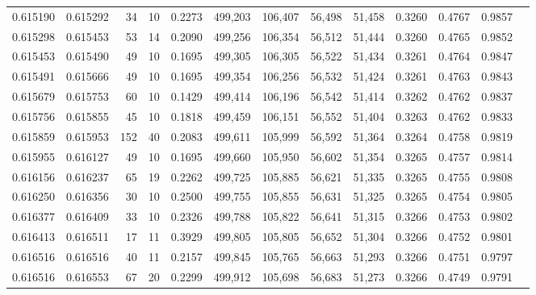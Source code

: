 \begin{tabular}{rrrrrrrrrrrrr}
0.615190 & 0.615292 &    34 &  10 &                                     0.2273 & 499,203 & 106,407 &  56,498 &  51,458 & 0.3260 & 0.4767 & 0.9857 \\
0.615298 & 0.615453 &    53 &  14 &                                     0.2090 & 499,256 & 106,354 &  56,512 &  51,444 & 0.3260 & 0.4765 & 0.9852 \\
0.615453 & 0.615490 &    49 &  10 &                                     0.1695 & 499,305 & 106,305 &  56,522 &  51,434 & 0.3261 & 0.4764 & 0.9847 \\
0.615491 & 0.615666 &    49 &  10 &                                     0.1695 & 499,354 & 106,256 &  56,532 &  51,424 & 0.3261 & 0.4763 & 0.9843 \\
0.615679 & 0.615753 &    60 &  10 &                                     0.1429 & 499,414 & 106,196 &  56,542 &  51,414 & 0.3262 & 0.4762 & 0.9837 \\
0.615756 & 0.615855 &    45 &  10 &                                     0.1818 & 499,459 & 106,151 &  56,552 &  51,404 & 0.3263 & 0.4762 & 0.9833 \\
0.615859 & 0.615953 &   152 &  40 &                                     0.2083 & 499,611 & 105,999 &  56,592 &  51,364 & 0.3264 & 0.4758 & 0.9819 \\
0.615955 & 0.616127 &    49 &  10 &                                     0.1695 & 499,660 & 105,950 &  56,602 &  51,354 & 0.3265 & 0.4757 & 0.9814 \\
0.616156 & 0.616237 &    65 &  19 &                                     0.2262 & 499,725 & 105,885 &  56,621 &  51,335 & 0.3265 & 0.4755 & 0.9808 \\
0.616250 & 0.616356 &    30 &  10 &                                     0.2500 & 499,755 & 105,855 &  56,631 &  51,325 & 0.3265 & 0.4754 & 0.9805 \\
0.616377 & 0.616409 &    33 &  10 &                                     0.2326 & 499,788 & 105,822 &  56,641 &  51,315 & 0.3266 & 0.4753 & 0.9802 \\
0.616413 & 0.616511 &    17 &  11 &                                     0.3929 & 499,805 & 105,805 &  56,652 &  51,304 & 0.3266 & 0.4752 & 0.9801 \\
0.616516 & 0.616516 &    40 &  11 &                                     0.2157 & 499,845 & 105,765 &  56,663 &  51,293 & 0.3266 & 0.4751 & 0.9797 \\
0.616516 & 0.616553 &    67 &  20 &                                     0.2299 & 499,912 & 105,698 &  56,683 &  51,273 & 0.3266 & 0.4749 & 0.9791 \\

\end{tabular}
